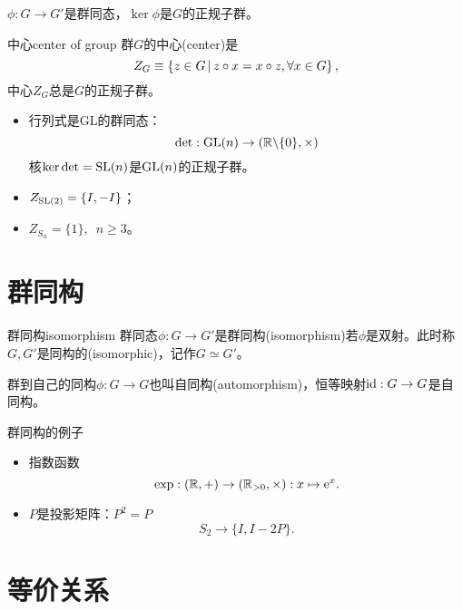 \begin{theorem}{}{}
	$\phi:G\to G'$是群同态，$\ker\phi$是$G$的正规子群。
\end{theorem}
\begin{definition}{中心}{center of group}
	群$G$的中心(center)是
	\begin{equation}
		Z_G\equiv\left\{z\in G\,\middle\vert\,z\circ x=x\circ z,\forall x\in G\right\},
	\end{equation}
	中心$Z_G$总是$G$的正规子群。
\end{definition}
\begin{example}{}{}
	\begin{itemize}
		\item 行列式是GL的群同态：
		\[
			\det:\operatorname{GL}(n)\to(\mathbb R\backslash\{0\},\times)
		\]
		核$\ker\det=\operatorname{SL}(n)$是$\operatorname{GL}(n)$的正规子群。
		\item $Z_{\operatorname{SL}(2)}=\{I,-I\}$；
		\item $Z_{S_n}=\{1\},\enspace n\geq 3$。
	\end{itemize}
\end{example}

\section{群同构}

\begin{definition}{群同构}{isomorphism}
	群同态$\phi:G\to G'$是群同构(isomorphism)若$\phi$是双射。此时称$G,G'$是同构的(isomorphic)，记作$G\simeq G'$。
\end{definition}
群到自己的同构$\phi:G\to G$也叫自同构(automorphism)，恒等映射$\operatorname{id}:G\to G$是自同构。
\begin{example}{群同构的例子}{}
	\begin{itemize}
		\item 指数函数
		\[
			\exp:(\mathbb R,+)\to(\mathbb R_{>0},\times):x\mapsto\mathop{}\!\mathrm{e}^ x.
		\]
		\item $P$是投影矩阵：$P^2=P$
		\[
			S_2\to\{I,I-2P\}.
		\]
	\end{itemize}
\end{example}

\section{等价关系}

